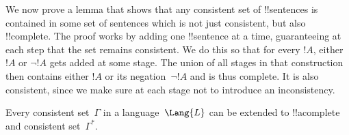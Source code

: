 
\begin{explain}
We now prove a lemma that shows that any consistent set of
!!{sentence}s is contained in some set of sentences which is not just
consistent, but also !!{complete}. The proof works by adding one
!!{sentence} at a time, guaranteeing at each step that the set remains
consistent. We do this so that for every $!A$, either $!A$ or $\lnot
!A$ gets added at some stage. The union of all stages in that
construction then contains either $!A$ or its negation~$\lnot !A$ and
is thus complete. It is also consistent, since we make sure at each
stage not to introduce an inconsistency.
\end{explain}

\begin{lem}
 Every consistent
set~$\Gamma$ in a language~$\Lang{L}$ can be
extended to !!a{complete} and consistent set~$\Gamma^*$.
\end{lem}

